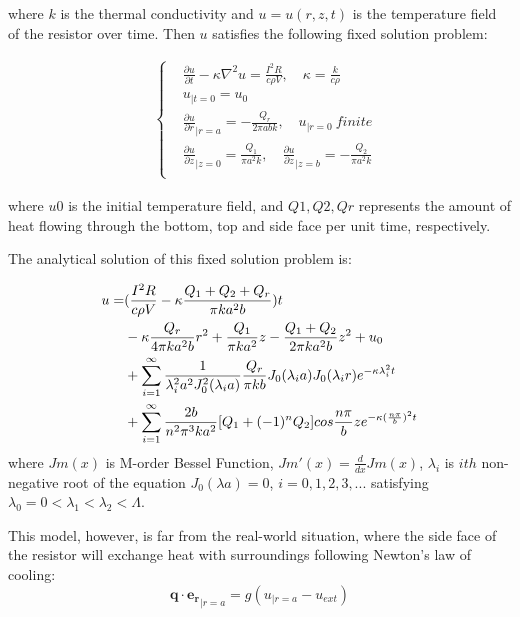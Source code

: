 \documentclass[10pt,a4paper,twocolumn,twoside,UTF8]{article}
\begin{document}
		where $k$ is the thermal conductivity and $u= u(r, z, t)$ is the temperature field of the resistor over time. 
		Then $u$ satisfies the following fixed solution problem:

		\begin{align}
			&\left\{
				\begin{aligned}
					& \frac{\partial u}{\partial t} - \kappa \nabla^2 u = \frac{I^2 R}{c\rho V}, \quad \kappa = \frac{k}{c\rho} \\
					& u_{|t=0} = u_0 \\
					& \frac{\partial u}{\partial r}_{|r=a} = -\frac{Q_r}{2\pi ab k}, \quad u_{|r=0} \ finite \\
					& \frac{\partial u}{\partial z}_{|z=0} = \frac{Q_1}{\pi a^2 k}, \quad \frac{\partial u}{\partial z}_{|z=b} = -\frac{Q_2}{\pi a^2 k} \\
				\end{aligned}
			\right.
			\label{eq.1.2}
		\end{align}

		where $u0$  is the initial temperature field, and $Q1, Q2, Qr$ represents the amount of heat flowing through the bottom, top and side face per unit time, respectively.

		The analytical solution of this fixed solution problem is:
		
		\begin{align}
			u = & (\frac{I^2 R}{c\rho V} - \kappa\frac{Q_1+Q_2+Q_r}{\pi ka^2b})t \notag \\
			    & - \kappa\frac{Q_r}{4\pi ka^2b}r^2 +
				\frac{Q_1}{\pi ka^2}z - \frac{Q_1+Q_2}{2\pi ka^2b}z^2 + u_0 \notag \\ 
				& +
				\sum_{i=1}^{\infty} \frac{1}{\lambda_i^2 a^2 J_0^2(\lambda_i a)} \frac{Q_r}{\pi kb} J_0(\lambda_i a)J_0(\lambda_i r)e^{-\kappa \lambda_i^2 t} \notag \\
				& +
				\sum_{i=1}^{\infty} \frac{2b}{n^2\pi^3ka^2} [Q_1+(-1)^nQ_2] cos\frac{n\pi}{b}z e^{-\kappa (\frac{n\pi}{b})^2 t} 
			\label{eq.1.3}
	    \end{align}
		where $Jm(x)$ is M-order Bessel Function, $Jm'(x) = \frac{d}{dx}Jm(x)$,  $\lambda_i$ is $ith$ non-negative root of the equation $J_0(\lambda a) = 0$, $i = 0,1,2,3, ...$ 
		satisfying $\lambda_0 = 0< \lambda_1 < \lambda_2 < \Lambda$.

		This model, however, is far from the real-world situation, where the side face of the resistor will exchange heat with surroundings following Newton's law of cooling:
		\begin{equation}
			\boldsymbol{q} \cdot \boldsymbol{e_r}_{|r=a} = g(u_{|r=a}-u_{ext})
			\label{eq.1.4}
		\end{equation}
		
\end{document}

